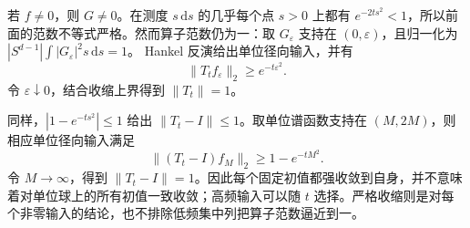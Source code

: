 \begin{solution}
若 \(f\ne0\)，则 \(G\ne0\)。在测度 \(s\,\mathrm ds\) 的几乎每个点 \(s>0\) 上都有 \(e^{-2ts^2}<1\)，所以前面的范数不等式严格。然而算子范数仍为一：取
\(G_\varepsilon\) 支持在 \((0,\varepsilon)\)，且归一化为
\(|S^{d-1}|\int|G_\varepsilon|^2s\,\mathrm ds=1\)。
Hankel 反演给出单位径向输入，并有
\[
 \|T_tf_\varepsilon\|_2\geq e^{-t\varepsilon^2}.
\]
令 \(\varepsilon\downarrow0\)，结合收缩上界得到 \(\|T_t\|=1\)。

同样，\(|1-e^{-ts^2}|\leq1\) 给出 \(\|T_t-I\|\leq1\)。取单位谱函数支持在 \((M,2M)\)，则相应单位径向输入满足
\[
 \|(T_t-I)f_M\|_2\geq1-e^{-tM^2}.
\]
令 \(M\to\infty\)，得到 \(\|T_t-I\|=1\)。因此每个固定初值都强收敛到自身，并不意味着对单位球上的所有初值一致收敛；高频输入可以随 \(t\) 选择。严格收缩则是对每个非零输入的结论，也不排除低频集中列把算子范数逼近到一。
\end{solution}
